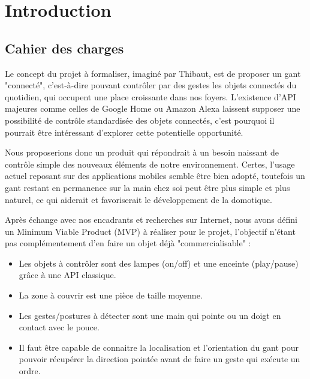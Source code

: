 \documentclass[10pt]{article}
\begin{document}
    

    
    \tableofcontents

    \section{Introduction}

        \subsection{Cahier des charges}

        Le concept du projet à formaliser, imaginé par Thibaut, est de proposer un gant "connecté", 
            c'est-à-dire pouvant contrôler par des gestes les objets connectés du quotidien,
            qui occupent une place croissante dans nos foyers. L'existence d'API majeures comme celles
            de Google Home ou Amazon Alexa laissent supposer une possibilité de contrôle standardisée
            des objets connectés, c'est pourquoi il pourrait être intéressant d'explorer cette
            potentielle opportunité.

        Nous proposerions donc un produit qui répondrait à un besoin naissant de contrôle simple des nouveaux
            éléments de notre environnement. Certes, l'usage actuel reposant sur des applications mobiles
            semble être bien adopté, toutefois un gant restant en permanence sur la main chez soi peut être plus
            simple et plus naturel, ce qui aiderait et favoriserait le développement de la domotique.

        Après échange avec nos encadrants et recherches sur Internet, nous avons défini un Minimum Viable Product (MVP)
            à réaliser pour le projet, l'objectif n'étant pas complémentement d'en faire un objet déjà
            "commercialisable" :
            \begin{itemize}
                \item Les objets à contrôler sont des lampes (on/off) et une enceinte (play/pause) grâce à une API classique.
                \item La zone à couvrir est une pièce de taille moyenne.
                \item Les gestes/postures à détecter sont une main qui pointe ou un doigt en contact avec le pouce.
                \item Il faut être capable de connaitre la localisation et l'orientation du gant pour pouvoir
                        récupérer la direction pointée
                        avant de faire un geste qui exécute un ordre.
            \end{itemize}
\end{document}

